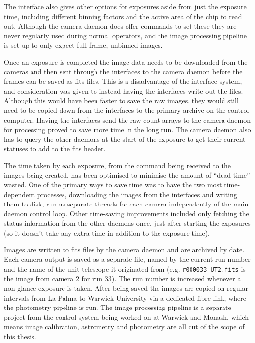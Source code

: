\begin{colsection}
\begin{colsection}
The  interface also gives other options for exposures aside from just the exposure time, including different binning factors and the active area of the chip to read out. Although the camera daemon does offer commands to set these they are never regularly used during normal operators, and the image processing pipeline is set up to only expect full-frame, unbinned images.

Once an exposure is completed the image data needs to be downloaded from the cameras and then sent through the interfaces to the camera daemon before the frames can be saved as \gls{fits} files. This is a disadvantage of the interface system, and consideration was given to instead having the interfaces write out the files. Although this would have been faster to save the raw images, they would still need to be copied down from the interfaces to the primary archive on the control computer. Having the interfaces send the raw count arrays to the camera daemon for processing proved to save more time in the long run. The camera daemon also has to query the other daemons at the start of the exposure to get their current statuses to add to the \gls{fits} header.

The time taken by each exposure, from the command being received to the images being created, has been optimised to minimise the amount of ``dead time'' wasted. One of the primary ways to save time was to have the two most time-dependent processes, downloading the images from the interfaces and writing them to disk, run as separate threads for each camera independently of the main daemon control loop. Other time-saving improvements included only fetching the status information from the other daemons once, just after starting the exposures (so it doesn't take any extra time in addition to the exposure time).

Images are written to \gls{fits} files by the camera daemon and are archived by date. Each camera output is saved as a separate file, named by the current run number and the name of the unit telescope it originated from (e.g. \texttt{r000033\_UT2.fits} is the image from camera 2 for run 33). The run number is increased whenever a non-glance exposure is taken. After being saved the images are copied on regular intervals from La Palma to Warwick University via a dedicated fibre link, where the photometry pipeline is run. The image processing pipeline is a separate project from the control system being worked on at Warwick and Monash, which means image calibration, astrometry and photometry are all out of the scope of this thesis.


\end{colsection}
\end{colsection}
